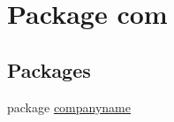 \hypertarget{namespacecom}{
\section{Package com}
\label{namespacecom}
}
\subsection*{Packages}
\begin{CompactItemize}
\item 
package \hyperlink{namespacecom_1_1companyname}{companyname}
\end{CompactItemize}
